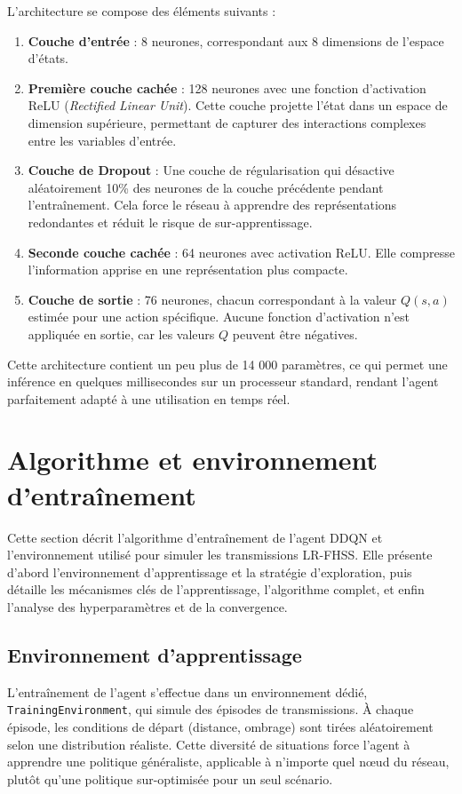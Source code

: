 L'architecture se compose des éléments suivants :
\begin{enumerate}
	\item \textbf{Couche d'entrée} : 8 neurones, correspondant aux 8 dimensions de l'espace d'états.
	\item \textbf{Première couche cachée} : 128 neurones avec une fonction d'activation ReLU (\textit{Rectified Linear Unit}). Cette couche projette l'état dans un espace de dimension supérieure, permettant de capturer des interactions complexes entre les variables d'entrée.
	\item \textbf{Couche de Dropout} : Une couche de régularisation qui désactive aléatoirement 10\% des neurones de la couche précédente pendant l'entraînement. Cela force le réseau à apprendre des représentations redondantes et réduit le risque de sur-apprentissage.
	\item \textbf{Seconde couche cachée} : 64 neurones avec activation ReLU. Elle compresse l'information apprise en une représentation plus compacte.
	\item \textbf{Couche de sortie} : 76 neurones, chacun correspondant à la valeur $Q(s, a)$ estimée pour une action spécifique. Aucune fonction d'activation n'est appliquée en sortie, car les valeurs $Q$ peuvent être négatives.
\end{enumerate}

Cette architecture contient un peu plus de 14 000 paramètres, ce qui permet une inférence en quelques millisecondes sur un processeur standard, rendant l'agent parfaitement adapté à une utilisation en temps réel.

\section{Algorithme et environnement d'entraînement}
\label{sec:algorithme-entrainement}
Cette section décrit l’algorithme d’entraînement de l’agent DDQN et l’environnement
utilisé pour simuler les transmissions LR-FHSS. Elle présente d’abord l’environnement
d’apprentissage et la stratégie d’exploration, puis détaille les mécanismes clés de
l’apprentissage, l’algorithme complet, et enfin l’analyse des hyperparamètres et
de la convergence.

\subsection{Environnement d'apprentissage}
\label{subsec:environnement-sequentiel}

L'entraînement de l'agent s'effectue dans un environnement dédié, \texttt{TrainingEnvironment}, qui simule des épisodes de transmissions. À chaque épisode, les conditions de départ (distance, ombrage) sont tirées aléatoirement selon une distribution réaliste. Cette diversité de situations force l'agent à apprendre une politique généraliste, applicable à n'importe quel nœud du réseau, plutôt qu'une politique sur-optimisée pour un seul scénario.


